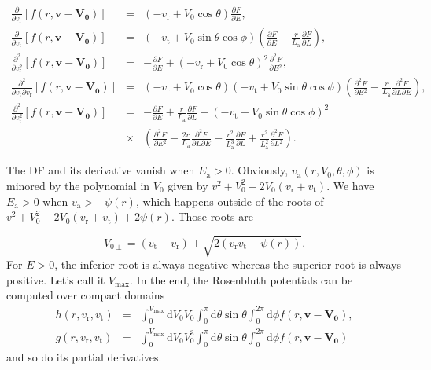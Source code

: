 \documentclass[11pt]{article}
\newcommand{\rt}{\mathrm{t}}
\newcommand{\rr}{\mathrm{r}}
\newcommand{\vr}{v_{\rr}}
\newcommand{\vt}{v_{\rt}}
\newcommand{\bv}{\boldsymbol{v}}
\newcommand{\ra}{\mathrm{a}}
\newcommand{\va}{v_{\ra}}
\newcommand{\bV}[1]{\boldsymbol{V_{#1}}}
\newcommand{\rd}{{\mathrm{d}}}
\newcommand{\Ea}{E_{\ra}}
\newcommand{\La}{L_{\ra}}
\newcommand{\Vmax}{V_{\max}}
\begin{document}
\begin{equation}
\begin{array}{ccl}
  \displaystyle{\frac{\partial}{\partial \vr}\left[f(r,\bv-\bV0)\right]} & =&\displaystyle{\left(-\vr+V_{0}\cos\theta\right)\frac{\partial F}{\partial E}} ,\\
  
   \displaystyle{\frac{\partial}{\partial \vt}\left[f(r,\bv-\bV0)\right]} & =&\displaystyle{\left(-\vt+V_{0}\sin\theta\cos\phi\right)\left(\frac{\partial F}{\partial E}-\frac{r}{\La}\frac{\partial F}{\partial L}\right)} ,\\
 
  \displaystyle{\frac{\partial^{2}}{\partial \vr^{2}}\left[f(r,\bv-\bV0)\right]} & =&\displaystyle{-\frac{\partial F}{\partial E}+\left(-\vr+V_{0}\cos\theta\right)^{2}\frac{\partial^{2}F}{\partial E{}^{2}}} ,\\
 
  \displaystyle{\frac{\partial^{2}}{\partial \vt\partial \vr}\left[f(r,\bv-\bV0)\right]} & =&\displaystyle{\left(-\vr+V_{0}\cos\theta\right)\left(-\vt+V_{0}\sin\theta\cos\phi\right)\left(\frac{\partial^{2}F}{\partial E{}^{2}}-\frac{r}{\La}\frac{\partial^{2}F}{\partial L\partial E}\right)} ,\\
 
  \displaystyle{\frac{\partial^{2}}{\partial \vt^{2}}\left[f(r,\bv-\bV0)\right]} & =&\displaystyle{-\frac{\partial F}{\partial E}+\frac{r}{\La}\frac{\partial F}{\partial L}+\left(-\vt+V_{0}\sin\theta\cos\phi\right)^{2}} \\
  {}&\times& \displaystyle{\left(\frac{\partial^{2}F}{\partial E{}^{2}}-\frac{2r}{\La}\frac{\partial^{2}F}{\partial L\partial E}-\frac{r^{2}}{\La^{3}}\frac{\partial F}{\partial L}+\frac{r^{2}}{\La^{2}}\frac{\partial^{2}F}{\partial L{}^{2}}\right)} .
\end{array}
\label{eq:DF_Derivatives}
\end{equation}

The DF and its derivative vanish when $\Ea>0$. Obviously, $\va(r,V_{0},\theta,\phi)$ is minored by the polynomial in $V_{0}$ given by $v^{2}+V_{0}^{2}-2V_{0}(\vr+\vt)$. We have $\Ea>0$ when $\va>-\psi(r)$, which happens outside of the roots of $v^{2}+V_{0}^{2}-2V_{0}(\vr+\vt)+2\psi(r)$. Those roots are

\begin{equation}
  V_{0 \pm} = (\vt+\vr)\pm\sqrt{2(\vr\vt-\psi(r))}.
  \label{eq:Vmax}
\end{equation}
For $E>0$, the inferior root is always negative whereas the superior root is always positive. Let's call it $\Vmax$. In the end, the Rosenbluth potentials can be computed over compact domains
\begin{equation}
\begin{array}{ccl}
  h(r,\vr,\vt) &=& \displaystyle{\int_{0}^{\Vmax}{\rd}V_{0} V_{0}\int_{0}^{\pi}{\rd}\theta\sin\theta\int_{0}^{2\pi}{\rd}\phi f(r,\bv-\bV0)} ,\\
  g(r,\vr,\vt) &=& \displaystyle{\int_{0}^{\Vmax}{\rd}V_{0} V_{0}^{3}\int_{0}^{\pi}{\rd}\theta\sin\theta\int_{0}^{2\pi}{\rd}\phi f(r,\bv-\bV0)}
\end{array}
\label{eq:Rosenbluth_finite}
\end{equation}
and so do its partial derivatives.
\end{document}
